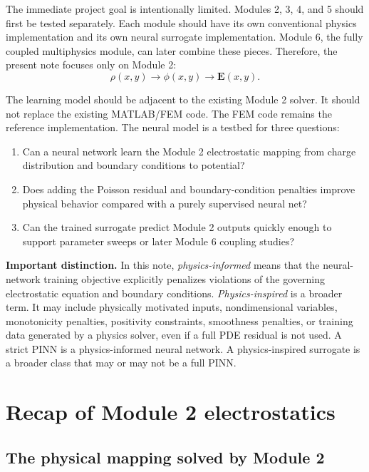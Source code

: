 \documentclass[11pt]{article}
\newcommand{\Evec}{\mathbf{E}}
\begin{document}
The immediate project goal is intentionally limited. Modules 2, 3, 4, and 5 should first be tested separately. Each module should have its own conventional physics implementation and its own neural surrogate implementation. Module 6, the fully coupled multiphysics module, can later combine these pieces. Therefore, the present note focuses only on Module 2:
\begin{equation}
\rho(x,y) \longrightarrow \phi(x,y) \longrightarrow \Evec(x,y).
\end{equation}

The learning model should be adjacent to the existing Module 2 solver. It should not replace the existing MATLAB/FEM code. The FEM code remains the reference implementation. The neural model is a testbed for three questions:
\begin{enumerate}[leftmargin=2em]
    \item Can a neural network learn the Module 2 electrostatic mapping from charge distribution and boundary conditions to potential?
    \item Does adding the Poisson residual and boundary-condition penalties improve physical behavior compared with a purely supervised neural net?
    \item Can the trained surrogate predict Module 2 outputs quickly enough to support parameter sweeps or later Module 6 coupling studies?
\end{enumerate}

\begin{physicsbox}
\textbf{Important distinction.} In this note, \emph{physics-informed} means that the neural-network training objective explicitly penalizes violations of the governing electrostatic equation and boundary conditions. \emph{Physics-inspired} is a broader term. It may include physically motivated inputs, nondimensional variables, monotonicity penalties, positivity constraints, smoothness penalties, or training data generated by a physics solver, even if a full PDE residual is not used. A strict PINN is a physics-informed neural network. A physics-inspired surrogate is a broader class that may or may not be a full PINN.
\end{physicsbox}

\section{Recap of Module 2 electrostatics}

\subsection{The physical mapping solved by Module 2}
\end{document}
